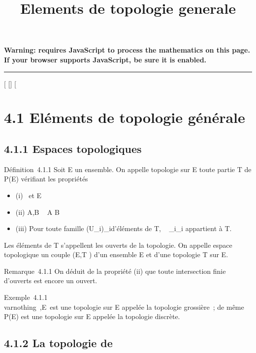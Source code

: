\documentclass[]{article}
\title{Elements de topologie generale}
\author{}
\date{}
\begin{document}
\maketitle

\textbf{Warning: 
requires JavaScript to process the mathematics on this page.\\ If your
browser supports JavaScript, be sure it is enabled.}

\begin{center}\rule{3in}{0.4pt}\end{center}

[
[]
[

\section{4.1 Eléments de topologie générale}

\subsection{4.1.1 Espaces topologiques}

Définition~4.1.1 Soit E un ensemble. On appelle topologie sur E toute
partie T de P(E) vérifiant les propriétés

\begin{itemize}
\itemsep1pt\parskip0pt
\item
  (i) \varnothing~\inT et E \inT
\item
  (ii) A,B \inT \rigtharrow~ A \bigcap B \inT
\item
  (iii) Pour toute famille (U_i)_i\inI d'éléments de T,
  \⋃ ~
  _i\inIU_i appartient à T.
\end{itemize}

Les éléments de T s'appellent les ouverts de la topologie. On appelle
espace topologique un couple (E,T ) d'un ensemble E et d'une topologie T
sur E.

Remarque~4.1.1 On déduit de la propriété (ii) que toute intersection
finie d'ouverts est encore un ouvert.

Exemple~4.1.1 \\varnothing~,E\ est une topologie
sur E appelée la topologie grossière~; de même P(E) est une topologie
sur E appelée la topologie discrète.

\subsection{4.1.2 La topologie de ~}
\end{document}
